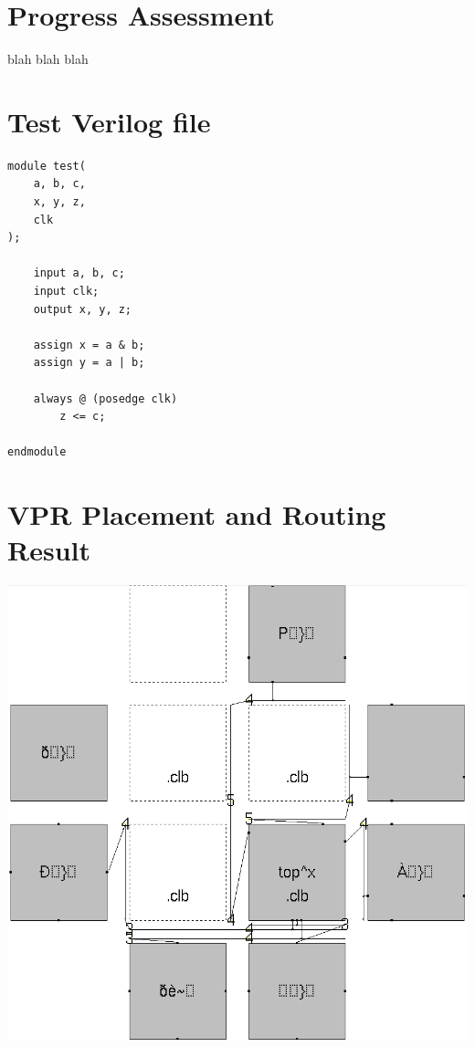 \documentclass[12pt,letterpaper]{article}
\begin{document}
\section{Progress Assessment}

blah blah blah




\pagebreak


\pagebreak
\begin{appendices}



\pagebreak
\section{Test Verilog file}

\begin{verbatim}
module test(
    a, b, c,
    x, y, z,
    clk
);
        
    input a, b, c;
    input clk;
    output x, y, z;

    assign x = a & b;
    assign y = a | b;

    always @ (posedge clk)
        z <= c;

endmodule
\end{verbatim}


\pagebreak
\section{VPR Placement and Routing Result}

\includegraphics[scale=0.5]{vpr.png}


\end{appendices}
\end{document}
